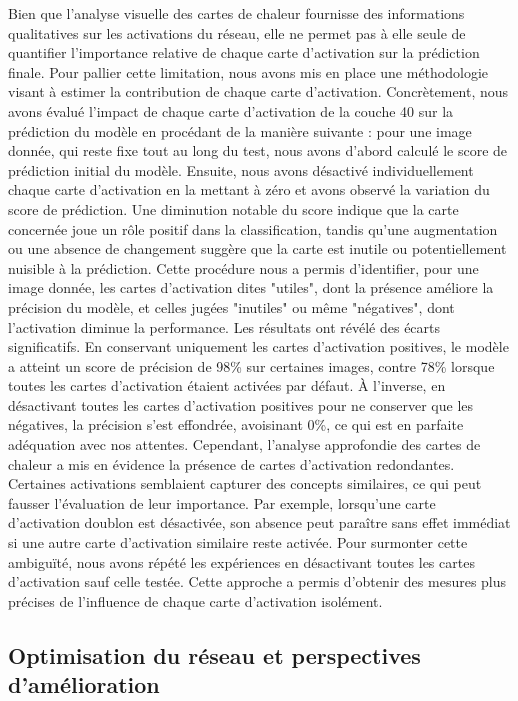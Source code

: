\documentclass[runningheads]{llncs}
\begin{document}
Bien que l'analyse visuelle des cartes de chaleur fournisse des informations qualitatives sur les activations du réseau, elle ne permet pas à elle seule de quantifier l'importance relative de chaque carte d'activation sur la prédiction finale. Pour pallier cette limitation, nous avons mis en place une méthodologie visant à estimer la contribution de chaque carte d'activation. Concrètement, nous avons évalué l'impact de chaque carte d'activation de la couche 40 sur la prédiction du modèle en procédant de la manière suivante : pour une image donnée, qui reste fixe tout au long du test, nous avons d'abord calculé le score de prédiction initial du modèle. Ensuite, nous avons désactivé individuellement chaque carte d'activation en la mettant à zéro et avons observé la variation du score de prédiction. Une diminution notable du score indique que la carte concernée joue un rôle positif dans la classification, tandis qu'une augmentation ou une absence de changement suggère que la carte est inutile ou potentiellement nuisible à la prédiction. Cette procédure nous a permis d'identifier, pour une image donnée, les cartes d'activation dites "utiles", dont la présence améliore la précision du modèle, et celles jugées "inutiles" ou même "négatives", dont l'activation diminue la performance. Les résultats ont révélé des écarts significatifs. En conservant uniquement les cartes d'activation positives, le modèle a atteint un score de précision de 98\% sur certaines images, contre 78\% lorsque toutes les cartes d'activation étaient activées par défaut. À l'inverse, en désactivant toutes les cartes d'activation positives pour ne conserver que les négatives, la précision s'est effondrée, avoisinant 0\%, ce qui est en parfaite adéquation avec nos attentes. Cependant, l'analyse approfondie des cartes de chaleur a mis en évidence la présence de cartes d'activation redondantes. Certaines activations semblaient capturer des concepts similaires, ce qui peut fausser l'évaluation de leur importance. Par exemple, lorsqu'une carte d'activation doublon est désactivée, son absence peut paraître sans effet immédiat si une autre carte d'activation similaire reste activée. Pour surmonter cette ambiguïté, nous avons répété les expériences en désactivant toutes les cartes d'activation sauf celle testée. Cette approche a permis d'obtenir des mesures plus précises de l'influence de chaque carte d'activation isolément.

\subsection{Optimisation du réseau et perspectives d'amélioration}
\end{document}

